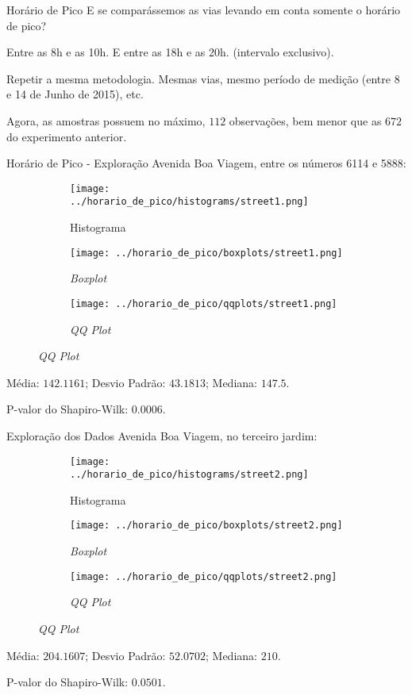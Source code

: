 \begin{frame}{Horário de Pico}
E se comparássemos as vias levando em conta somente o horário de pico?

\vskip 0.25cm

Entre as 8h e as 10h. E entre as 18h e as 20h. (intervalo exclusivo).

\vskip 0.25cm

Repetir a mesma metodologia. Mesmas vias, mesmo período de medição (entre 8 e 14
de Junho de 2015), etc.

\vskip 0.25cm

Agora, as amostras possuem no máximo, $112$
observações, bem menor que as $672$ do experimento anterior.
\end{frame}

\begin{frame}{Horário de Pico - Exploração}
Avenida Boa Viagem, entre os números 6114 e 5888:
\vskip 0.05cm
\begin{figure}
	\centering
	\begin{subfigure}{.33\textwidth}
		\centering
		\texttt{[image: ../horario\_de\_pico/histograms/street1.png]}
		\caption*{Histograma}
	\end{subfigure}%
	\begin{subfigure}{.33\textwidth}
		\centering
		\texttt{[image: ../horario\_de\_pico/boxplots/street1.png]}
		\caption*{\textit{Boxplot}}
	\end{subfigure}
	\begin{subfigure}{.32\textwidth}
		\centering
		\texttt{[image: ../horario\_de\_pico/qqplots/street1.png]}
		\caption*{\textit{QQ Plot}}
	\end{subfigure}
\end{figure}
\vskip 0.05cm
Média: $142.1161$; Desvio Padrão: $43.1813$; Mediana: $147.5$.

P-valor do Shapiro-Wilk: $0.0006$.
\end{frame}

\begin{frame}{Exploração dos Dados}
Avenida Boa Viagem, no terceiro jardim:
\vskip 0.05cm
\begin{figure}
	\centering
	\begin{subfigure}{.33\textwidth}
		\centering
		\texttt{[image: ../horario\_de\_pico/histograms/street2.png]}
		\caption*{Histograma}
	\end{subfigure}%
	\begin{subfigure}{.33\textwidth}
		\centering
		\texttt{[image: ../horario\_de\_pico/boxplots/street2.png]}
		\caption*{\textit{Boxplot}}
	\end{subfigure}
	\begin{subfigure}{.32\textwidth}
		\centering
		\texttt{[image: ../horario\_de\_pico/qqplots/street2.png]}
		\caption*{\textit{QQ Plot}}
	\end{subfigure}
\end{figure}
\vskip 0.05cm
Média: $204.1607$; Desvio Padrão: $52.0702$; Mediana: $210$.

P-valor do Shapiro-Wilk: $0.0501$.
\end{frame}

